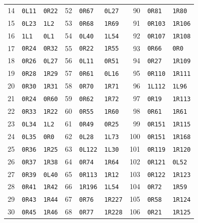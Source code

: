 \begin{center}
\begin{tabular}{rll@{\hspace{9mm}}rll@{\hspace{9mm}}rll}
14 & \texttt{0L11} & \texttt{0R22} & 52 & \texttt{0R67} & \texttt{0L27} & 90 & \texttt{0R81} & \texttt{1R80} \\
15 & \texttt{0L23} & \texttt{1L2} & 53 & \texttt{0R68} & \texttt{1R69} & 91 & \texttt{0R103} & \texttt{1R106} \\
16 & \texttt{1L1} & \texttt{0L1} & 54 & \texttt{0L40} & \texttt{1L54} & 92 & \texttt{0R107} & \texttt{1R108} \\
17 & \texttt{0R24} & \texttt{0R32} & 55 & \texttt{0R22} & \texttt{1R55} & 93 & \texttt{0R66} & \texttt{0R0} \\
18 & \texttt{0R26} & \texttt{0L27} & 56 & \texttt{0L11} & \texttt{0R51} & 94 & \texttt{0R27} & \texttt{1R109} \\
19 & \texttt{0R28} & \texttt{1R29} & 57 & \texttt{0R61} & \texttt{0L16} & 95 & \texttt{0R110} & \texttt{1R111} \\
20 & \texttt{0R30} & \texttt{1R31} & 58 & \texttt{0R70} & \texttt{1R71} & 96 & \texttt{1L112} & \texttt{1L96} \\
21 & \texttt{0R24} & \texttt{0R60} & 59 & \texttt{0R62} & \texttt{1R72} & 97 & \texttt{0R19} & \texttt{1R113} \\
22 & \texttt{0R33} & \texttt{1R22} & 60 & \texttt{0R55} & \texttt{1R60} & 98 & \texttt{0R61} & \texttt{1R61} \\
23 & \texttt{0L34} & \texttt{1L2} & 61 & \texttt{0R49} & \texttt{0R25} & 99 & \texttt{0R151} & \texttt{1R115} \\
24 & \texttt{0L35} & \texttt{0R0} & 62 & \texttt{0L28} & \texttt{1L73} & 100 & \texttt{0R151} & \texttt{1R168} \\
25 & \texttt{0R36} & \texttt{1R25} & 63 & \texttt{0L122} & \texttt{1L30} & 101 & \texttt{0R119} & \texttt{1R120} \\
26 & \texttt{0R37} & \texttt{1R38} & 64 & \texttt{0R74} & \texttt{1R64} & 102 & \texttt{0R121} & \texttt{0L52} \\
27 & \texttt{0R39} & \texttt{0L40} & 65 & \texttt{0R113} & \texttt{1R12} & 103 & \texttt{0R122} & \texttt{1R123} \\
28 & \texttt{0R41} & \texttt{1R42} & 66 & \texttt{1R196} & \texttt{1L54} & 104 & \texttt{0R72} & \texttt{1R59} \\
29 & \texttt{0R43} & \texttt{1R44} & 67 & \texttt{0R76} & \texttt{1R227} & 105 & \texttt{0R58} & \texttt{1R124} \\
30 & \texttt{0R45} & \texttt{1R46} & 68 & \texttt{0R77} & \texttt{1R228} & 106 & \texttt{0R21} & \texttt{1R125} \\

\end{tabular}
\end{center}

